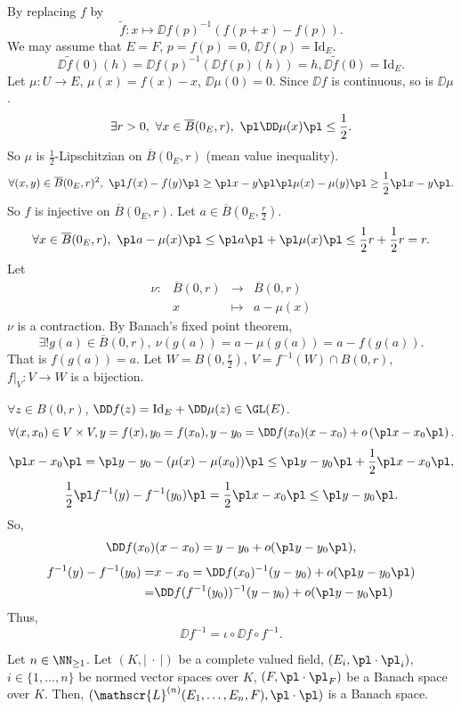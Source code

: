 \begin{proofenv}
    By replacing $f$ by 
    $$\tilde{ f}:x\longmapsto \DD f(p)^{-1}\left(f(p+x)-f(p)\right).$$
    We may assume that $E=F$, $p=f(p)=0$, $\DD f(p)=\mathrm{Id}_E$.
    $$ \DD \tilde{f}(0)(h)=\DD f(p)^{-1}(\DD f(p)(h))=h,\DD \tilde{f}(0)=\mathrm{Id}_E.$$
    Let $\mu: U\longrightarrow E$, $\mu(x)=f(x)-x$, $\DD \mu(0)=0$. Since $\DD f$ is continuous, so is $\DD \mu$.
    $$ \exists r>0,\ \forall x \in \overline{B}(0_E,r),\ \pl \DD \mu(x)\pl\le \frac{1}{2}.$$
    So $\mu$ is $\frac{1}{2}$-Lipschitzian on $\overline{B}(0_E,r)$ (mean value inequality).
    $$ \forall (x,y)\in \overline{B}(0_E,r)^2,\ \pl f(x)- f(y)\pl \ge \pl x-y\pl \pl \mu(x)-\mu(y)\pl \ge \frac{1}{2}\pl x-y\pl.$$
    So $f$ is injective on $\overline{B}(0_E,r)$. Let $a\in \overline{B}(0_E,\frac{r}{2})$.
    $$ \forall x\in \overline{B}(0_E,r),\ \pl a-\mu(x)\pl\le \pl a\pl+\pl \mu(x)\pl \le \frac{1}{2}r+\frac{1}{2}r=r.$$
    Let
    $$\begin{array}{rrcl}
        \nu :&\overline{B}(0,r)&\longrightarrow &\overline{B}(0,r)\\
        &x&\longmapsto &a-\mu(x)
    \end{array}$$
    $\nu$ is a contraction. By Banach's fixed point theorem, 
    $$\exists ! g(a)\in \overline{B}(0,r),\ \nu(g(a))=a-\mu(g(a))=a-f(g(a)).$$
    That is $f(g(a))=a$. Let $W=B(0,\frac{r}{2})$, $V=f^{-1}(W)\cap B(0,r)$, $f|_V:V\longrightarrow W$ is a bijection.

    \quad $\forall z\in B(0,r)$, $\DD f(z)=\mathrm{Id}_E+\DD \mu(z)\in \GL(E)$. 
    $$\forall (x,x_0)\in V\times V,y=f(x), y_0=f(x_0), y-y_0=\DD f(x_0)(x-x_0)+o\left(\pl x-x_0\pl\right).$$
    $$ \pl x-x_0 \pl= \pl y-y_0- (\mu(x)-\mu(x_0))\pl \le \pl y-y_0\pl +\frac{1}{2}\pl x-x_0\pl ,$$
    $$ \frac{1}{2} \pl f^{-1}(y)-f^{-1}(y_0)\pl =\frac{1}{2} \pl x-x_0 \pl \le \pl y-y_0\pl. $$
    So,
    $$ \DD f(x_0)(x-x_0)=y-y_0+o(\pl y-y_0\pl),$$
    \begin{align*}
        f^{-1}(y)-f^{-1}(y_0)=&x-x_0=\DD f(x_0)^{-1}(y-y_0)+o(\pl y-y_0\pl )\\
        =&\DD f(f^{-1}(y_0))^{-1}(y-y_0)+o(\pl y-y_0\pl) \\
    \end{align*}
    Thus,
    $$ \DD f^{-1}=\iota\circ \DD f \circ f^{-1}.$$
\end{proofenv}
\begin{propositionenv}
    Let $n\in \NN_{\ge 1}$. Let $(K,\left|\ \cdot\ \right|)$ be a complete valued field, $(E_i,\pl\cdot\pl_i)$, $i\in \{1,\ldots,n\}$ be normed vector spaces over $K$, $(F,\pl\cdot\pl_F)$ be a Banach space over $K$. 
    Then, $(\mathscr{L}^{(n)}(E_1,\ldots,E_n, F),\pl \cdot\pl)$ is a Banach space.
\end{propositionenv}
